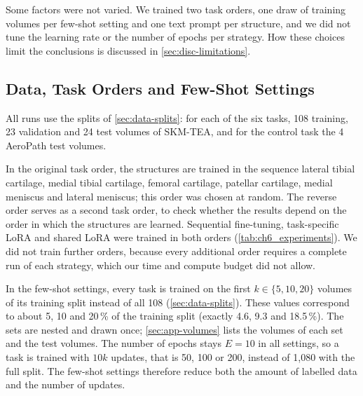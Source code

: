 Some factors were not varied.
We trained two task orders, one draw of training volumes per few-shot setting and one text prompt per structure, and we did not tune the learning rate or the number of epochs per strategy.
How these choices limit the conclusions is discussed in \cref{sec:disc-limitations}.

\begin{table}[tb]
\centering
\caption[Overview of the experiments]{Overview of the experiments. Each configuration was trained once. Training volumes per task: 108 is the full training split. Objective: number of the research objective in \cref{sec:intro-rq}. All runs use the original task order unless stated otherwise.}
\label{tab:ch6_experiments}

\end{table}

\subsection{Data, Task Orders and Few-Shot Settings}
\label{subsec:exp-data}

All runs use the splits of \cref{sec:data-splits}: for each of the six tasks, 108 training, 23 validation and 24 test volumes of SKM-TEA, and for the control task the 4 AeroPath test volumes.

In the original task order, the structures are trained in the sequence lateral tibial cartilage, medial tibial cartilage, femoral cartilage, patellar cartilage, medial meniscus and lateral meniscus; this order was chosen at random.
The reverse order serves as a second task order, to check whether the results depend on the order in which the structures are learned.
Sequential fine-tuning, task-specific LoRA and shared LoRA were trained in both orders (\cref{tab:ch6_experiments}).
We did not train further orders, because every additional order requires a complete run of each strategy, which our time and compute budget did not allow.

In the few-shot settings, every task is trained on the first $k \in \{5, 10, 20\}$ volumes of its training split instead of all 108 (\cref{sec:data-splits}).
These values correspond to about 5, 10 and 20\,\% of the training split (exactly 4.6, 9.3 and 18.5\,\%).
The sets are nested and drawn once; \cref{sec:app-volumes} lists the volumes of each set and the test volumes.
The number of epochs stays $E = 10$ in all settings, so a task is trained with $10k$ updates, that is 50, 100 or 200, instead of 1{,}080 with the full split.
The few-shot settings therefore reduce both the amount of labelled data and the number of updates.

